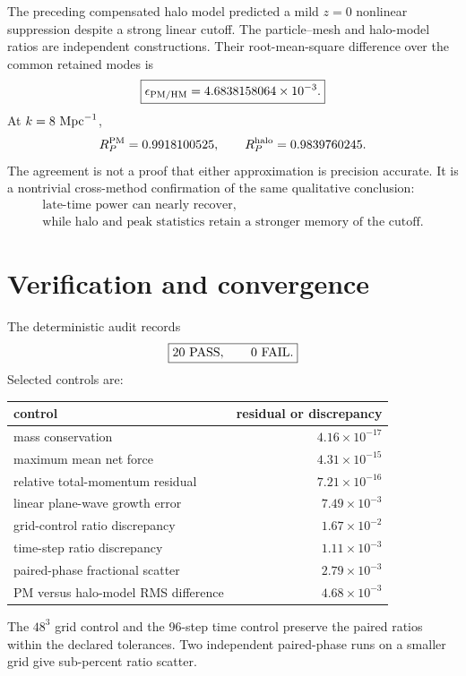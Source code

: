 The preceding compensated halo model predicted a mild $z=0$ nonlinear suppression despite a strong linear cutoff.  The particle--mesh and halo-model ratios are independent constructions.  Their root-mean-square difference over the common retained modes is
\begin{equation}
 \boxed{
 \epsilon_{\rm PM/HM}=4.6838158064\times10^{-3}.
 }
 \label{eq:pm-halo-rms}
\end{equation}
At $k=8\ {\rm Mpc}^{-1}$,
\begin{equation}
 R_P^{\rm PM}=0.9918100525,
 \qquad
 R_P^{\rm halo}=0.9839760245.
 \label{eq:pm-halo-k8}
\end{equation}
The agreement is not a proof that either approximation is precision accurate.  It is a nontrivial cross-method confirmation of the same qualitative conclusion:
\begin{equation}
 \boxed{
 \begin{gathered}
 \text{late-time power can nearly recover,}\\
 \text{while halo and peak statistics retain a stronger memory of the cutoff.}
 \end{gathered}
 }
 \label{eq:pm-cross-method-conclusion}
\end{equation}

\section{Verification and convergence}

The deterministic audit records
\begin{equation}
 \boxed{20\ {\rm PASS},\qquad0\ {\rm FAIL}.}
 \label{eq:pm-audit-total}
\end{equation}
Selected controls are:
\begin{center}
\begin{tabular}{lr}
\toprule
control & residual or discrepancy\\
\midrule
mass conservation & $4.16\times10^{-17}$\\
maximum mean net force & $4.31\times10^{-15}$\\
relative total-momentum residual & $7.21\times10^{-16}$\\
linear plane-wave growth error & $7.49\times10^{-3}$\\
grid-control ratio discrepancy & $1.67\times10^{-2}$\\
time-step ratio discrepancy & $1.11\times10^{-3}$\\
paired-phase fractional scatter & $2.79\times10^{-3}$\\
PM versus halo-model RMS difference & $4.68\times10^{-3}$\\
\bottomrule
\end{tabular}
\end{center}
The $48^3$ grid control and the 96-step time control preserve the paired ratios within the declared tolerances.  Two independent paired-phase runs on a smaller grid give sub-percent ratio scatter.

